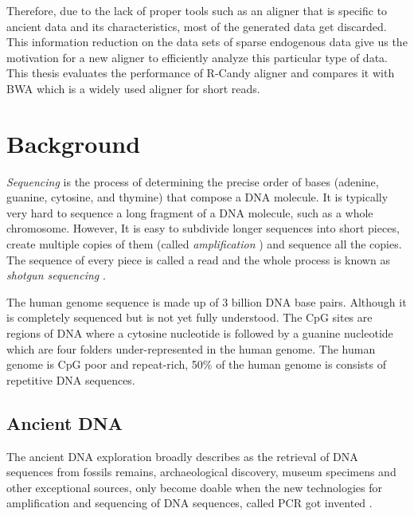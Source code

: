 \documentclass[11pt,a4paper]{report}
\begin{document}
Therefore, due to the lack of proper tools such as an aligner that is 
specific to ancient data and its characteristics, most of the generated 
data get discarded. 
This information reduction on the data sets of sparse endogenous data give 
us the motivation for a new aligner to efficiently analyze this particular
type of data.
\\
This thesis evaluates the performance of R-Candy aligner and compares it 
with BWA which is a widely used aligner for short reads.






\clearpage
\section{Background } \label{Background }


\emph{Sequencing} is the process of determining the precise order of bases 
(adenine, guanine, cytosine, and thymine) that compose a DNA molecule. 
It is typically very hard to sequence a long fragment of a DNA molecule, 
such as a whole chromosome. However, It is easy to subdivide longer sequences
into short pieces, create multiple copies of them (called \emph{amplification} ) 
and sequence all the copies. The sequence of every piece is called a read and 
the whole process is known as \emph{shotgun sequencing} \cite{algorithmDesign}.


The human genome sequence is made up of 3 billion DNA base pairs.
Although it is completely sequenced but is not yet fully understood. 
The CpG sites are regions of DNA where a cytosine nucleotide is followed by 
a guanine nucleotide which are four folders under-represented in the human genome. 
The human genome is CpG poor and repeat-rich, 50\% of the human genome is consists 
of repetitive DNA sequences.




\subsection{Ancient DNA } \label{Ancient DNA }
The ancient DNA exploration broadly describes as the retrieval of DNA sequences 
from fossils remains, archaeological discovery, museum specimens and other 
exceptional sources, only become doable when the new technologies for amplification
and sequencing of DNA sequences, called PCR got invented \cite{paabo2004genetic}.
\end{document}
